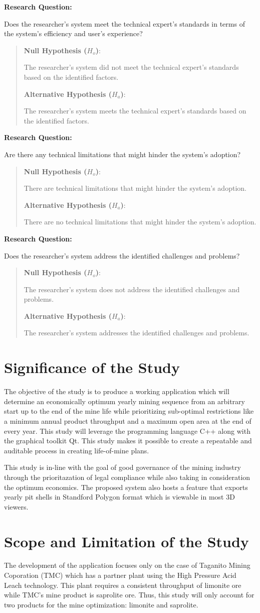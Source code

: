 \documentclass[12pt]{report}
\newcommand{\hypothesis}[3]{
\noindent \textbf{Research Question:}
\par#1
\begin{quotation}
    \noindent \textbf{Null Hypothesis ($H_o$)}:
    \par#2

    \noindent \textbf{Alternative Hypothesis ($H_a$)}:
    \par#3
\end{quotation}
}
\begin{document}
\hypothesis{
Does the researcher's system meet the technical expert's standards in terms of the system's efficiency and user's experience?
}{
The researcher's system did not meet the technical expert's standards based on the identified factors.
}{
The researcher's system meets the technical expert's standards based on the identified factors.
}

\hypothesis{
Are there any technical limitations that might hinder the system's adoption?
}{
There are technical limitations that might hinder the system's adoption.
}{
There are no technical limitations that might hinder the system's adoption.
}

\hypothesis{
Does the researcher's system address the identified challenges and problems?
}{
The researcher's system does not address the identified challenges and problems.
}{
The researcher's system addresses the identified challenges and problems.
}

\section{Significance of the Study}

The objective of the study is to produce a working application which will determine an economically optimum yearly mining sequence from an arbitrary start up to the end of the mine life while prioritizing sub-optimal restrictions like a minimum annual product throughput and a maximum open area at the end of every year.
This study will leverage the programming language C++\cite{cpp} along with the graphical toolkit Qt\cite{qt}.
This study makes it possible to create a repeatable and auditable process in creating life-of-mine plans.

This study is in-line with the goal of good governance of the mining industry through the prioritazation of legal compliance while also taking in consideration the optimum economics.
The proposed system also hosts a feature that exports yearly pit shells in Standford Polygon format \cite{ply} which is viewable in most 3D viewers.

\section{Scope and Limitation of the Study}

The development of the application focuses only on the case of Taganito Mining Coporation (TMC) which has a partner plant using the High Pressure Acid Leach technology.
This plant requires a consistent throughput of limonite ore while TMC's mine product is saprolite ore.
Thus, this study will only account for two products for the mine optimization: limonite and saprolite.
\end{document}
